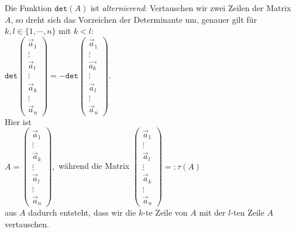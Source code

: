 \begin{Satz}
  Die Funktion $\mathtt{det}(A)$ ist \emph{alternierend}: Vertauschen wir zwei Zeilen der Matrix
  $A$, so dreht sich das Vorzeichen der Determinante um, genauer gilt f\"ur $k,l \in \{1,\cdots,n\}$
  mit $k < l$:
  \\[0.2cm]
  \hspace*{1.3cm}
$\mathtt{det}\left(
  \begin{array}{ll}
    \vec{a}_1 \\ \vdots \\ \vec{a}_l \\ \vdots \\ \vec{a}_k \\ \vdots \\ \vec{a}_n
  \end{array} 
  \right) = - \mathtt{det}\left(
  \begin{array}{ll}
    \vec{a}_1 \\ \vdots \\ \vec{a_k} \\ \vdots \\ \vec{a}_l \\ \vdots \\ \vec{a}_n
  \end{array} 
  \right)
$.
\\[0.2cm]
Hier ist 
\\[0.2cm]
\hspace*{1.3cm}
$A = \left(
  \begin{array}{ll}
    \vec{a}_1 \\ \vdots \\ \vec{a}_k \\ \vdots \\ \vec{a}_l \\ \vdots \\ \vec{a}_n
  \end{array} 
  \right),
$
\quad w\"ahrend die Matrix \quad
$\left(
  \begin{array}{ll}
    \vec{a}_1 \\ \vdots \\ \vec{a}_l \\ \vdots \\ \vec{a}_k \\ \vdots \\ \vec{a}_n
  \end{array} 
  \right) =: \tau(A)
$
\\[0.2cm]
aus $A$ dadurch entsteht, dass wir die $k$-te Zeile von $A$ mit der $l$-ten Zeile $A$ vertauschen.
\end{Satz}


